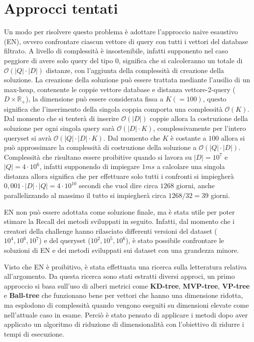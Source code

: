 \section{Approcci tentati}
Un modo per risolvere questo problema è adottare l'approccio naive esaustivo (EN), ovvero 
confrontare ciascun vettore di query con tutti i vettori del database filtrato. 
A livello di complessità è insostenibile, infatti supponento nel caso peggiore 
di avere solo query del tipo $0$, significa che si calcoleranno un totale di 
$\mathcal{O}(|Q| \cdot |D|)$ distanze, con l'aggiunta della complessità di creazione
della soluzione. La creazione della soluzione può essere trattata mediante l'ausilio 
di un max-heap, contenente le coppie vettore database e distanza vettore-2-query ($D\times \mathbb{R}_+$),
la dimensione può essere considerata fissa a $K(=100)$, questo significa che l'inserimento 
della singola coppia comporta una complessità $\mathcal{O}(K)$. Dal momento che 
si tenterà di inserire $\mathcal{O}(|D|)$ coppie allora la costruzione della 
soluzione per ogni singola query sarà $\mathcal{O}(|D|\cdot K)$, complessivamente per l'intero 
queryset si avrà $\mathcal{O}(|Q| \cdot |D|\cdot K)$. Dal momento che $K$ è costante 
a $100$ allora si può approssimare la complessità di costruzione della soluzione 
a  $\mathcal{O}(|Q| \cdot |D|)$. Complessità che risultano essere proibitive quando 
si lavora su $|D|= 10^7$ e $|Q|= 4\cdot 10^6$, infatti supponendo di impiegare $1ms$ 
a calcolare una singola distanza allora significa che per effettuare solo tutti i 
confronti si impiegherà $0,001 \cdot |D| \cdot |Q| = 4\cdot 10^{10}$
secondi che vuol dire circa $1268$ giorni, anche parallelizzando al massimo 
il tutto si impiegherà circa $1268/32 = 39$ giorni. 

EN non può essere adottata come soluzione finale, ma è stata utile per poter 
stimare la Recall dei metodi sviluppati in seguito. Infatti, dal momento che i 
creatori della challenge hanno rilasciato differenti versioni del dataset ($10^4, 10^6, 10^7$) e del 
queryset ($10^2, 10^5, 10^6$), è stato possibile confrontare le soluzioni di EN
e dei metodi sviluppati sui dataset con una grandezza minore. 

Visto che EN è proibitivo, è stata effettuata una ricerca sulla letteratura 
relativa all'argomento. Da questa ricerca sono stati estratti diversi approci, 
un primo approccio si basa sull'uso di alberi metrici come \textbf{KD-tree}, \textbf{MVP-tree}, \textbf{VP-tree} e \textbf{Ball-tree} 
che funzionano bene per vettori che hanno una dimensione ridotta, ma esplodono 
di complessità quando vengono eseguiti su dimensioni elevate come nell'attuale 
caso in esame. Perciò è stato pensato di applicare i metodi dopo aver applicato 
un algoritmo di riduzione di dimensionalità con l'obiettivo di ridurre 
i tempi di esecuzione.

